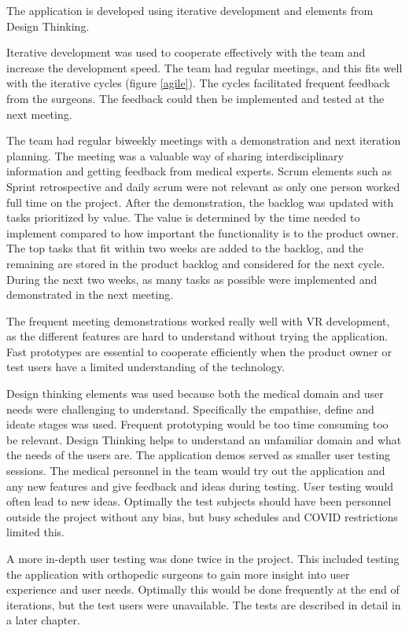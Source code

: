 \documentclass[a4paper]{report}
\begin{document}
The application is developed using iterative development and elements from Design Thinking.

Iterative development was used to cooperate effectively with the team and increase the development speed. The team had regular meetings, and this fits well with the iterative cycles (figure \ref{agile}). The cycles facilitated frequent feedback from the surgeons. The feedback could then be implemented and tested at the next meeting.

The team had regular biweekly meetings with a demonstration and next iteration planning. The meeting was a valuable way of sharing interdisciplinary information and getting feedback from medical experts. Scrum elements such as Sprint retrospective and daily scrum were not relevant as only one person worked full time on the project.
After the demonstration, the backlog was updated with tasks prioritized by value. The value is determined by the time needed to implement compared to how important the functionality is to the product owner. The top tasks that fit within two weeks are added to the backlog, and the remaining are stored in the product backlog and considered for the next cycle.
During the next two weeks, as many tasks as possible were implemented and demonstrated in the next meeting.


The frequent meeting demonstrations worked really well with VR development, as the different features are hard to understand without trying the application. Fast prototypes are essential to cooperate efficiently when the product owner or test users have a limited understanding of the technology.


Design thinking elements was used because both the medical domain and user needs were challenging to understand. Specifically the empathise, define and ideate stages was used. Frequent prototyping would be too time consuming too be relevant. Design Thinking helps to understand an unfamiliar domain and what the needs of the users are.
The application demos served as smaller user testing sessions. The medical personnel in the team would try out the application and any new features and give feedback and ideas during testing. User testing would often lead to new ideas. Optimally the test subjects should have been personnel outside the project without any bias, but busy schedules and COVID restrictions limited this.

A more in-depth user testing was done twice in the project. This included testing the application with orthopedic surgeons to gain more insight into user experience and user needs. Optimally this would be done frequently at the end of iterations, but the test users were unavailable. The tests are described in detail in a later chapter.
\end{document}
